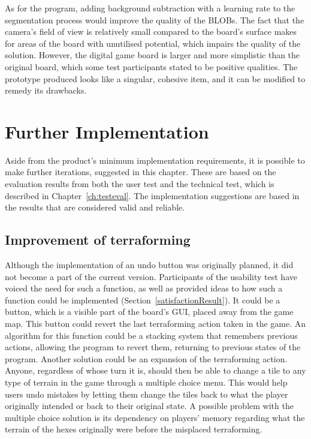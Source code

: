 As for the program, adding background subtraction with a learning rate to the segmentation process would improve the quality of the BLOBs. The fact that the camera’s field of view is relatively small compared to the board’s surface makes for areas of the board with unutilised potential, which impairs the quality of the solution. However, the digital game board is larger and more simplistic than the original board, which some test participants stated to be positive qualities. The prototype produced looks like a singular, cohesive item, and it can be modified to remedy its drawbacks.

\section{Further Implementation}
Aside from the product's minimum implementation requirements, it is possible to make further iterations, suggested in this chapter. These are based on the evaluation results from both the user test and the technical test, which is described in Chapter~\ref{ch:testeval}. The implementation suggestions are based in the results that are considered valid and reliable.

\subsection{Improvement of terraforming}
Although the implementation of an undo button was originally planned, it did not become a part of the current version. Participants of the usability test have voiced the need for such a function, as well as provided ideas to how such a function could be implemented (Section~\ref{satisfactionResult}). It could be a button, which is a visible part of the board's GUI, placed away from the game map. This button could revert the last terraforming action taken in the game. An algorithm for this function could be a stacking system that remembers previous actions, allowing the program to revert them, returning to previous states of the program. Another solution could be an expansion of the terraforming action. Anyone, regardless of whose turn it is, should then be able to change a tile to any type of terrain in the game through a multiple choice menu. This would help users undo mistakes by letting them change the tiles back to what the player originally intended or back to their original state. A possible problem with the multiple choice solution is its dependency on players' memory regarding what the terrain of the hexes originally were before the misplaced terraforming. 

